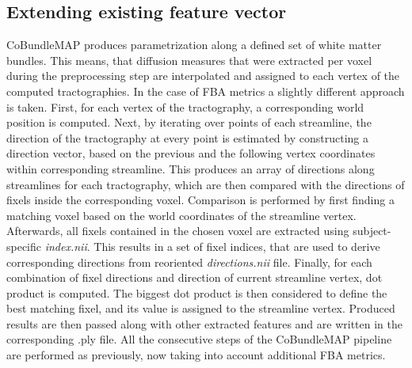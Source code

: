 \documentclass[thesis.tex]{subfiles}
\begin{document}
\subsection{Extending existing feature vector}
CoBundleMAP produces parametrization along a defined set of white matter bundles. This means, that diffusion measures that were extracted per voxel during the preprocessing step are interpolated and assigned to each vertex of the computed tractographies. In the case of FBA metrics a slightly different approach is taken. First, for each vertex of the tractography, a corresponding world position is computed. Next, by iterating over points of each streamline, the direction of the tractography at every point is estimated by constructing a direction vector, based on the previous and the following vertex coordinates within corresponding streamline. This produces an array of directions along streamlines for each tractography, which are then compared with the directions of fixels inside the corresponding voxel. Comparison is performed by first finding a matching voxel based on the world coordinates of the streamline vertex. Afterwards, all fixels contained in the chosen voxel are extracted using subject-specific \textit{index.nii}. This results in a set of fixel indices, that are used to derive corresponding directions from reoriented \textit{directions.nii} file. Finally, for each combination of fixel directions and direction of current streamline vertex, dot product is computed. The biggest dot product is then considered to define the best matching fixel, and its value is assigned to the streamline vertex. Produced results are then passed along with other extracted features and are written in the corresponding .ply file. All the consecutive steps of the CoBundleMAP pipeline are performed as previously, now taking into account additional FBA metrics.
\end{document}
